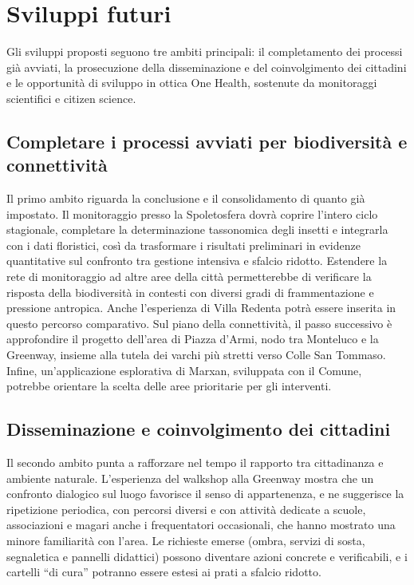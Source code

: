 \documentclass[
  a4paper,
]{book}
\begin{document}
\section{Sviluppi futuri}\label{sviluppi-futuri}

Gli sviluppi proposti seguono tre ambiti principali: il completamento dei processi già avviati, la prosecuzione della disseminazione e del coinvolgimento dei cittadini e le opportunità di sviluppo in ottica One Health, sostenute da monitoraggi scientifici e citizen science.

\subsection{Completare i processi avviati per biodiversità e connettività}\label{completare-i-processi-avviati-per-biodiversituxe0-e-connettivituxe0}

Il primo ambito riguarda la conclusione e il consolidamento di quanto già impostato. Il monitoraggio presso la Spoletosfera dovrà coprire l'intero ciclo stagionale, completare la determinazione tassonomica degli insetti e integrarla con i dati floristici, così da trasformare i risultati preliminari in evidenze quantitative sul confronto tra gestione intensiva e sfalcio ridotto. Estendere la rete di monitoraggio ad altre aree della città permetterebbe di verificare la risposta della biodiversità in contesti con diversi gradi di frammentazione e pressione antropica. Anche l'esperienza di Villa Redenta potrà essere inserita in questo percorso comparativo.
Sul piano della connettività, il passo successivo è approfondire il progetto dell'area di Piazza d'Armi, nodo tra Monteluco e la Greenway, insieme alla tutela dei varchi più stretti verso Colle San Tommaso.
Infine, un'applicazione esplorativa di Marxan, sviluppata con il Comune, potrebbe orientare la scelta delle aree prioritarie per gli interventi.

\subsection{Disseminazione e coinvolgimento dei cittadini}\label{disseminazione-e-coinvolgimento-dei-cittadini}

Il secondo ambito punta a rafforzare nel tempo il rapporto tra cittadinanza e ambiente naturale. L'esperienza del walkshop alla Greenway mostra che un confronto dialogico sul luogo favorisce il senso di appartenenza, e ne suggerisce la ripetizione periodica, con percorsi diversi e con attività dedicate a scuole, associazioni e magari anche i frequentatori occasionali, che hanno mostrato una minore familiarità con l'area. Le richieste emerse (ombra, servizi di sosta, segnaletica e pannelli didattici) possono diventare azioni concrete e verificabili, e i cartelli ``di cura'' potranno essere estesi ai prati a sfalcio ridotto.
\end{document}
